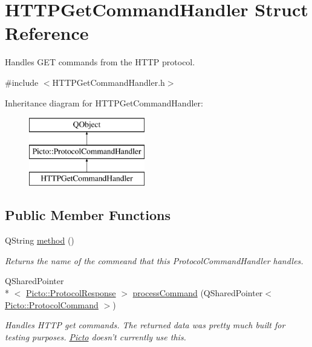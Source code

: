 \hypertarget{struct_h_t_t_p_get_command_handler}{\section{H\-T\-T\-P\-Get\-Command\-Handler Struct Reference}
\label{struct_h_t_t_p_get_command_handler}
}


Handles G\-E\-T commands from the H\-T\-T\-P protocol.  




{\ttfamily \#include $<$H\-T\-T\-P\-Get\-Command\-Handler.\-h$>$}

Inheritance diagram for H\-T\-T\-P\-Get\-Command\-Handler\-:\begin{figure}[H]
\begin{center}
\leavevmode
\includegraphics[height=3.000000cm]{struct_h_t_t_p_get_command_handler}
\end{center}
\end{figure}
\subsection*{Public Member Functions}
\begin{DoxyCompactItemize}
\item 
\hypertarget{struct_h_t_t_p_get_command_handler_a93675d51857131ea25f7409b9c3217c7}{Q\-String \hyperlink{struct_h_t_t_p_get_command_handler_a93675d51857131ea25f7409b9c3217c7}{method} ()}\label{struct_h_t_t_p_get_command_handler_a93675d51857131ea25f7409b9c3217c7}

\begin{DoxyCompactList}\small\item\em Returns the name of the commeand that this Protocol\-Command\-Handler handles. \end{DoxyCompactList}\item 
\hypertarget{struct_h_t_t_p_get_command_handler_a07d90d2d8049227c3d4ed4098ad3233a}{Q\-Shared\-Pointer\\*
$<$ \hyperlink{struct_picto_1_1_protocol_response}{Picto\-::\-Protocol\-Response} $>$ \hyperlink{struct_h_t_t_p_get_command_handler_a07d90d2d8049227c3d4ed4098ad3233a}{process\-Command} (Q\-Shared\-Pointer$<$ \hyperlink{struct_picto_1_1_protocol_command}{Picto\-::\-Protocol\-Command} $>$)}\label{struct_h_t_t_p_get_command_handler_a07d90d2d8049227c3d4ed4098ad3233a}

\begin{DoxyCompactList}\small\item\em Handles H\-T\-T\-P get commands. The returned data was pretty much built for testing purposes. \hyperlink{namespace_picto}{Picto} doesn't currently use this. \end{DoxyCompactList}\end{DoxyCompactItemize}



